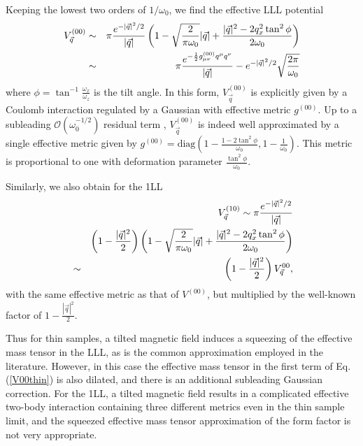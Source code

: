 \documentclass[twocolumn,showpacs,amsmath,amstex,amssymb,mathfonts,prb]{revtex4-1}
\begin{document}
Keeping the lowest two orders of $1/\omega_0$, we find the effective LLL potential
\begin{eqnarray}
V^{(00)}_{\vec q}&\sim& \pi \frac{e^{-|\vec q|^2/2}}{|\vec q|}\left(1-\sqrt{\frac{2}{\pi\omega_0}}|\vec q|+\frac{|\vec q|^2-2q_x^2\tan^2\phi}{2\omega_0}\right)\notag\\
&\sim& \pi\frac{e^{-\frac1{2}g^{(00)}_{\mu\nu}q^\mu q^\nu}}{|\vec q|}-e^{-|\vec q|^2/2}\sqrt{\frac{2\pi}{\omega_0}}
\label{V00thin}
\end{eqnarray}
where $\phi =\tan^{-1}\frac{\omega_x}{\omega_z}$ is the tilt angle. In this form, $V^{(00)}_{\vec q}$ is explicitly given by a Coulomb interaction regulated by a Gaussian with effective metric $g^{(00)}$. Up to a subleading $\mathcal{O}(\omega_0^{-1/2})$ residual term %
, $V^{(00)}_{\vec q}$ is indeed well approximated by a single effective metric given by $g^{(00)}=\text{diag}\left(1-\frac{1-2\tan^2\phi}{\omega_0},1-\frac1{\omega_0}\right)$. This metric is proportional to one with deformation parameter $\frac{\tan^2\phi}{\omega_0}$.  

Similarly, we also obtain for the 1LL
\begin{eqnarray}
&&V^{(10)}_{\vec q} \sim \pi \frac{e^{-|\vec q|^2/2}}{|\vec q|} \notag \\
& &\left(1-\frac{|\vec q|^2}{2}\right)\left(1-\sqrt{\frac{2}{\pi\omega_0}}|\vec q|+\frac{|\vec q|^2-2q_x^2\tan^2\phi}{2\omega_0}\right) \notag\\
&\sim& \left(1-\frac{|\vec q|^2}{2}\right)V^{00}_{\vec q},
\end{eqnarray}
with the same effective metric as that of $V^{(00)}$, but multiplied by the well-known factor of $1-\frac{|\vec q|^2}{2}$. %

Thus for thin samples, a tilted magnetic field induces a squeezing of the effective mass tensor in the LLL, as is the common approximation employed in the literature. However, in this case the effective mass tensor in the first term of Eq.(\ref{V00thin}) is also dilated, and there is an additional subleading Gaussian correction. For the 1LL, a tilted magnetic field results in a complicated effective two-body interaction containing three different metrics even in the thin sample limit, and the squeezed effective mass tensor approximation of the form factor is not very appropriate.
\end{document}
